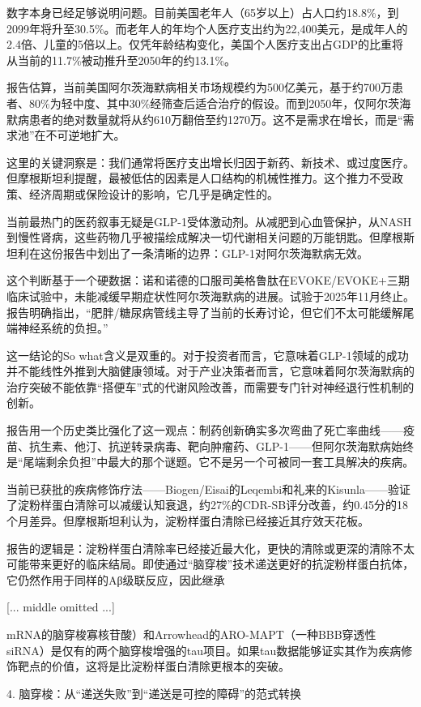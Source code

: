 \documentclass[11pt]{ctexart}
\begin{document}
数字本身已经足够说明问题。目前美国老年人（65岁以上）占人口约18.8\%，到2099年将升至30.5\%。而老年人的年均个人医疗支出约为22,400美元，是成年人的2.4倍、儿童的5倍以上。仅凭年龄结构变化，美国个人医疗支出占GDP的比重将从当前的11.7\%被动推升至2050年的约13.1\%。

报告估算，当前美国阿尔茨海默病相关市场规模约为500亿美元，基于约700万患者、80\%为轻中度、其中30\%经筛查后适合治疗的假设。而到2050年，仅阿尔茨海默病患者的绝对数量就将从约610万翻倍至约1270万。这不是需求在增长，而是“需求池”在不可逆地扩大。

这里的关键洞察是：我们通常将医疗支出增长归因于新药、新技术、或过度医疗。但摩根斯坦利提醒，最被低估的因素是人口结构的机械性推力。这个推力不受政策、经济周期或保险设计的影响，它几乎是确定性的。

当前最热门的医药叙事无疑是GLP-1受体激动剂。从减肥到心血管保护，从NASH到慢性肾病，这些药物几乎被描绘成解决一切代谢相关问题的万能钥匙。但摩根斯坦利在这份报告中划出了一条清晰的边界：GLP-1对阿尔茨海默病无效。

这个判断基于一个硬数据：诺和诺德的口服司美格鲁肽在EVOKE/EVOKE+三期临床试验中，未能减缓早期症状性阿尔茨海默病的进展。试验于2025年11月终止。报告明确指出，“肥胖/糖尿病管线主导了当前的长寿讨论，但它们不太可能缓解尾端神经系统的负担。”

这一结论的So what含义是双重的。对于投资者而言，它意味着GLP-1领域的成功并不能线性外推到大脑健康领域。对于产业决策者而言，它意味着阿尔茨海默病的治疗突破不能依靠“搭便车”式的代谢风险改善，而需要专门针对神经退行性机制的创新。

报告用一个历史类比强化了这一观点：制药创新确实多次弯曲了死亡率曲线——疫苗、抗生素、他汀、抗逆转录病毒、靶向肿瘤药、GLP-1——但阿尔茨海默病始终是“尾端剩余负担”中最大的那个谜题。它不是另一个可被同一套工具解决的疾病。

当前已获批的疾病修饰疗法——Biogen/Eisai的Leqembi和礼来的Kisunla——验证了淀粉样蛋白清除可以减缓认知衰退，约27\%的CDR-SB评分改善，约0.45分的18个月差异。但摩根斯坦利认为，淀粉样蛋白清除已经接近其疗效天花板。

报告的逻辑是：淀粉样蛋白清除率已经接近最大化，更快的清除或更深的清除不太可能带来更好的临床结局。即使通过“脑穿梭”技术递送更好的抗淀粉样蛋白抗体，它仍然作用于同样的Aβ级联反应，因此继承

[... middle omitted ...]

 mRNA的脑穿梭寡核苷酸）和Arrowhead的ARO-MAPT（一种BBB穿透性siRNA）是仅有的两个脑穿梭增强的tau项目。如果tau数据能够证实其作为疾病修饰靶点的价值，这将是比淀粉样蛋白清除更根本的突破。

4. 脑穿梭：从“递送失败”到“递送是可控的障碍”的范式转换
\end{document}
